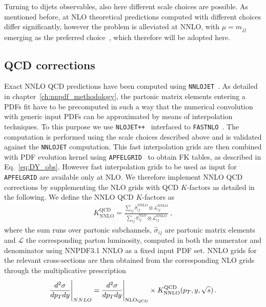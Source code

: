 %
Turning to dijets observables, also here different scale choices are possible. As mentioned before, at NLO theoretical predictions
computed with different choices differ significantly, however the problem is alleviated at NNLO, with $\mu = m_{jj}$
emerging as the preferred choice~\cite{Currie:2017eqf,Currie:2018oxh}, which therefore will be adopted here. 

\subsection{QCD corrections}
Exact NNLO QCD predictions have been computed using {\tt NNLOJET}~\cite{Gehrmann-DeRidder:2019ibf}. 
As detailed in chapter~\ref{ch:nnpdf_methodology}, the partonic matrix elements entering a PDFs fit
have to be precomputed in such a way that the numerical convolution with generic input PDFs can be approximated by means
of interpolation techniques. 
To this purpose we use {\tt NLOJET++}~\cite{Nagy:2001fj} interfaced to {\tt F{\small AST}NLO}~\cite{Wobisch:2011ij}.
The computation is performed using the scale choices described above and is validated against the {\tt NNLOJET} computation.
This fast interpolation grids are then combined with PDF evolution kernel using {\tt APFEL{\small GRID}}~\cite{Bertone:2016lga}
to obtain FK tables, as described in Eq.~\eqref{eq:DY_obs}.
However fast interpolation grids to be used as input for {\tt APFEL{\small GRID}} are available only at NLO.
We therefore implement NNLO QCD corrections by supplementing the NLO grids with QCD $K$-factors as detailed in the following.
We define the NNLO QCD $K$-factors as
\begin{align}
    \label{eq:QCD_kfactors}
    K^{\text{QCD}}_{\text{NNLO}} = \frac{\sum_{ij}\hat{\sigma}_{ij}^{\text{NNLO}}\otimes \mathcal{L}_{ij}^{\text{NNLO}}}
    {\sum_{ij}\hat{\sigma}_{ij}^{\text{NLO}}\otimes \mathcal{L}_{ij}^{\text{NNLO}}}\,,
\end{align}
where the sum runs over partonic subchannels, $\hat{\sigma}_{ij}$ are partonic matrix elements and $\mathcal{L}$
the corresponding parton luminosity, computed in both the numerator and denominator using NNPDF3.1 NNLO as a fixed input 
PDF set.
NNLO grids for the relevant cross-sections are then obtained from the corresponding NLO grids through the multiplicative
prescription
\begin{align}
    \label{eq:NNLO_kfactors}
    \frac{d^2\sigma}{dp_T dy}\Bigg|_{NNLO} = \frac{d^2\sigma}{dp_T dy}
    \Bigg|_{\rm NLO_{QCD}} \times K_{\rm NNLO}^{\rm QCD}(p_T,y,\sqrt{s})\, .
\end{align}
